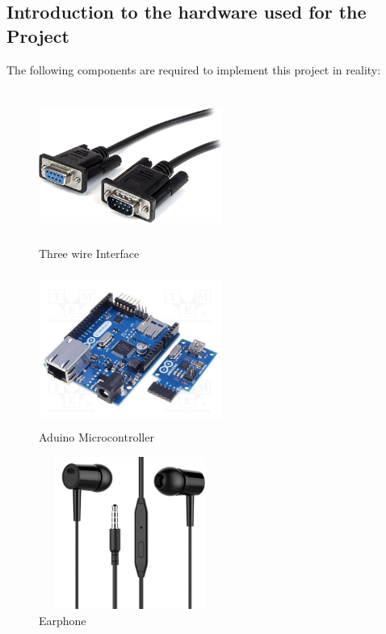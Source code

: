 \documentclass[12pt,a4paper]{article}
\begin{document}
\subsection{Introduction to the hardware used for the Project}
The following components are required to implement this project in reality:

\begin{figure}[H]
\centering
\includegraphics[width=6cm,height=5cm]{3wire.jpg}
\caption{Three wire Interface}
\label{Three wire Interface.jpg}
\end{figure}

\begin{figure}[H]
\centering
\includegraphics[width=6cm,height=5cm]{arduino.jpg}
\caption{Aduino Microcontroller}
\label{Arduino Microcontroller.jpg}
\end{figure}

\begin{figure}[H]
\centering
\includegraphics[width=6cm,height=5cm]{earphone.jpg}
\caption{Earphone}
\label{Earphone.jpg}
\end{figure}
\end{document}
